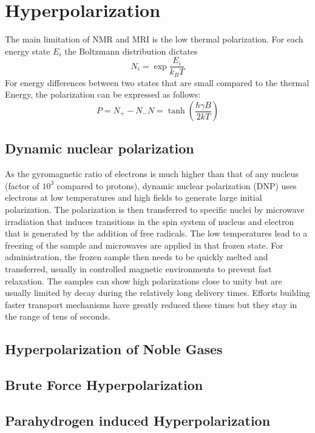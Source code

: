 	\section{Hyperpolarization}
		The main limitation of NMR and MRI is the low thermal polarization.
		For each energy state $E_i$ the Boltzmann distribution dictates
		\begin{equation}
			N_i = \exp{\frac{E_i}{k_B T}}
		\end{equation}
		For energy differences between two states that are small compared to
		the thermal Energy, the polarization can be expressed as follows:
		\begin{equation}
			P = {N_+-N_-}{N} = \tanh\left(\frac{\hbar \gamma B}{2 k T }\right)
		\end{equation}
		\subsection{Dynamic nuclear polarization}
			As the gyromagnetic ratio of electrons is much higher than that of any nucleus (factor
			of $10^{3}$ compared to protons), dynamic nuclear polarization (DNP) uses electrons at
			low temperatures and high fields to generate large initial polarization. The
			polarization is then transferred to specific nuclei by microwave irradiation that
			induces transitions in the spin system of nucleus and electron that is generated by the
			addition of free radicals. The low temperatures lead to a freezing of the sample and
			microwaves are applied in that frozen state. For administration, the frozen sample then
			needs to be quickly melted and transferred, usually in controlled magnetic environments
			to prevent fast relaxation. The samples can show high polarizations close to unity but
			are usually limited by decay during the relatively long delivery times. Efforts building
			faster transport mechanisms have greatly reduced these times but they stay in the range
			of tens of seconds.
		\subsection{Hyperpolarization of Noble Gases}
		\subsection{Brute Force Hyperpolarization}
		\subsection{Parahydrogen induced Hyperpolarization}
